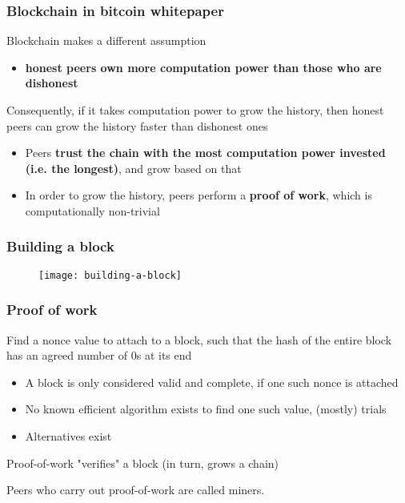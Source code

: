 \documentclass{beamer}
\begin{document}
\begin{frame}
\frametitle{Blockchain in bitcoin whitepaper}

Blockchain makes a different assumption
\begin{itemize}
  \item \textbf{honest peers own more computation power than those who are dishonest}
\end{itemize}

\vspace{0.2in}

Consequently, if it takes computation power to grow the history, then honest peers can grow the history faster than dishonest ones
\begin{itemize}
  \item Peers \textbf{trust the chain with the most computation power invested (i.e. the longest)}, and grow based on that
  \item In order to grow the history, peers perform a \textbf{proof of work}, which is computationally non-trivial
\end{itemize}

\end{frame}

\begin{frame}
\frametitle{Building a block}

\begin{figure}
  \centering
  \texttt{[image: building-a-block]}
\end{figure}

\end{frame}

\begin{frame}
\frametitle{Proof of work}

Find a nonce value to attach to a block, such that the hash of the entire block has an agreed number of $0$s at its end
\begin{itemize}
  \item A block is only considered valid and complete, if one such nonce is attached
  \item No known efficient algorithm exists to find one such value, (mostly) trials
  \item Alternatives exist
\end{itemize}

\vspace{0.2in}
Proof-of-work "verifies" a block (in turn, grows a chain)

\vspace{0.2in}
Peers who carry out proof-of-work are called miners.

\end{frame}
\end{document}
